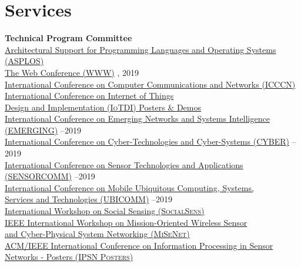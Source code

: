 
\section{\sc Services}
{\bf Technical Program Committee}\\
{\href{https://asplos-conference.org/2021}{Architectural Support for Programming Languages and Operating Systems (\textsc{ASPLOS})}} \\
{\href{https://www2019.thewebconf.org/}{The Web Conference (\textsc{WWW})}} , 2019\\
{\href{http://www.icccn.org//}{International Conference on Computer Communications and Networks (\textsc{ICCCN})}} \\
{\href{http://conferences.computer.org/iotDI/2019/}{International Conference on Internet of Things \\\mbox{\hspace{0.6cm}} Design and Implementation (\textsc{IoTDI}) Posters \& Demos}} \\
{\href{http://www.iaria.org/conferences2019/EMERGING19.html}{International Conference on Emerging Networks and Systems Intelligence \\\mbox{\hspace{0.6cm}} (\textsc{EMERGING})}} --2019\\
{\href{http://www.iaria.org/conferences2019/CYBER19.html}{International Conference on Cyber-Technologies and Cyber-Systems (\textsc{CYBER})}} --2019\\
{\href{http://www.iaria.org/conferences2019/SENSORCOMM19.html}{International Conference on Sensor Technologies and Applications \\\mbox{\hspace{0.6cm}} (\textsc{SENSORCOMM})}} --2019\\
{\href{http://www.iaria.org/conferences2019/UBICOMM18.html}{International Conference on Mobile Ubiquitous Computing, Systems,\\\mbox{\hspace{0.6cm}} Services and Technologies (\textsc{UBICOMM})}} --2019\\
{\href{https://www.cse.buffalo.edu/~lusu/SocialSens2018/}{International Workshop on Social Sensing (\textsc{SocialSens})}} \\
{\href{http://infocom2018.ieee-infocom.org/content/workshop-misenet-mission-oriented-wireless-sensor-networking}{IEEE International Workshop on Mission-Oriented Wireless Sensor \\\mbox{\hspace{0.6cm}} and Cyber-Physical System Networking (\textsc{MiSeNet})}} \\
{\href{http://ipsn.acm.org/2016/posters.html}{ACM/IEEE International Conference on Information Processing in Sensor\\\mbox{\hspace{0.6cm}} Networks - Posters (\textsc{IPSN Posters})}} \\
\vspace{-0.6cm}

